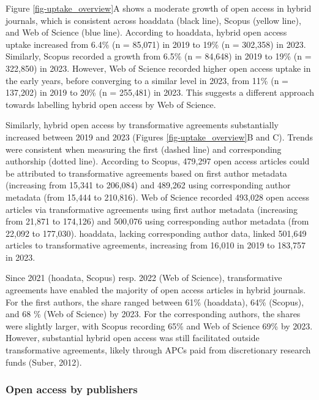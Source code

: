 \documentclass[a4paper,man,floatsintext,longtable,noextraspace,10pt]{apa6}
\begin{document}
Figure \ref{fig-uptake_overview}A shows a moderate growth of open access
in hybrid journals, which is consistent across hoaddata (black line),
Scopus (yellow line), and Web of Science (blue line). According to
hoaddata, hybrid open access uptake increased from 6.4\% (n = 85,071) in
2019 to 19\% (n = 302,358) in 2023. Similarly, Scopus recorded a growth
from 6.5\% (n = 84,648) in 2019 to 19\% (n = 322,850) in 2023. However,
Web of Science recorded higher open access uptake in the early years,
before converging to a similar level in 2023, from 11\% (n = 137,202) in
2019 to 20\% (n = 255,481) in 2023. This suggests a different approach
towards labelling hybrid open access by Web of Science.

Similarly, hybrid open access by transformative agreements substantially
increased between 2019 and 2023 (Figures \ref{fig-uptake_overview}B and
C). Trends were consistent when measuring the first (dashed line) and
corresponding authorship (dotted line). According to Scopus, 479,297
open access articles could be attributed to transformative agreements
based on first author metadata (increasing from 15,341 to 206,084) and
489,262 using corresponding author metadata (from 15,444 to 210,816).
Web of Science recorded 493,028 open access articles via transformative
agreements using first author metadata (increasing from 21,871 to
174,126) and 500,076 using corresponding author metadata (from 22,092 to
177,030). hoaddata, lacking corresponding author data, linked 501,649
articles to transformative agreements, increasing from 16,010 in 2019 to
183,757 in 2023.

Since 2021 (hoadata, Scopus) resp. 2022 (Web of Science), transformative
agreements have enabled the majority of open access articles in hybrid
journals. For the first authors, the share ranged between 61\%
(hoaddata), 64\% (Scopus), and 68 \% (Web of Science) by 2023. For the
corresponding authors, the shares were slightly larger, with Scopus
recording 65\% and Web of Science 69\% by 2023. However, substantial
hybrid open access was still facilitated outside transformative
agreements, likely through APCs paid from discretionary research funds
(Suber, 2012).

\subsubsection{Open access by
publishers}\label{open-access-by-publishers}
\end{document}
